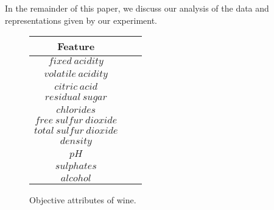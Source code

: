 In the remainder of this paper, we discuss our analysis of the data and representations
given by our experiment.



\begin{figure}[htb]
  \centering %

  \begin{tabular}{|c|c|c|} 
    \hline \hline %
    Feature \\ %
    \hline %
    $fixed~acidity$\\
    $volatile~acidity$\\
    $citric~acid$\\
    $residual~sugar$\\
    $chlorides$\\
    $free~sulfur~dioxide$\\
    $total~sulfur~dioxide$\\
    $density$\\
    $pH$\\
    $sulphates$\\
    $alcohol$\\
    \hline \hline
  \end{tabular}

  \caption{Objective attributes of wine.}
  \label{tab:attributes}
\end{figure}


